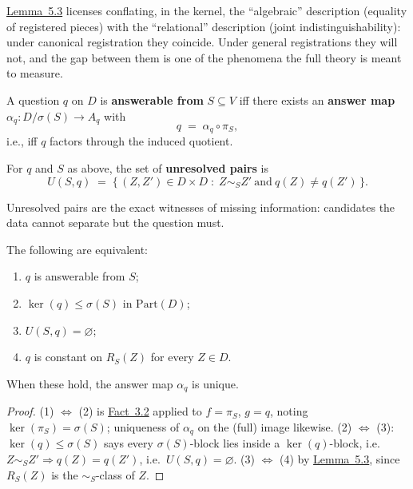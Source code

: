\hyperlink{stmt:5.3}{Lemma~5.3} licenses conflating, in the kernel, the ``algebraic'' description (equality of registered pieces) with the ``relational'' description (joint indistinguishability): under canonical registration they coincide. Under general registrations they will not, and the gap between them is one of the phenomena the full theory is meant to measure.

\begin{thmdef}

A question \(q\) on \(D\) is \textbf{answerable from} \(S \subseteq V\) iff there exists an \textbf{answer map} \(\alpha_q : D/\sigma(S) \to A_q\) with
\[
q \;=\; \alpha_q \circ \pi_S ,
\]
i.e., iff \(q\) factors through the induced quotient.
\end{thmdef}

\begin{thmdef}

For \(q\) and \(S\) as above, the set of \textbf{unresolved pairs} is
\[
U(S, q) \;=\; \{\, (Z, Z') \in D \times D \;:\; Z \sim_S Z' \ \text{and}\ q(Z) \neq q(Z') \,\}.
\]
\end{thmdef}

Unresolved pairs are the exact witnesses of missing information: candidates the data cannot separate but the question must.

\begin{thmplain}

The following are equivalent:

\begin{enumerate}
\def\labelenumi{\arabic{enumi}.}
\tightlist
\item
  \(q\) is answerable from \(S\);
\item
  \(\ker(q) \le \sigma(S)\) in \(\mathrm{Part}(D)\);
\item
  \(U(S, q) = \varnothing\);
\item
  \(q\) is constant on \(R_S(Z)\) for every \(Z \in D\).
\end{enumerate}

When these hold, the answer map \(\alpha_q\) is unique.
\end{thmplain}

\begin{proof}

(1) \(\iff\) (2) is \hyperlink{stmt:3.2}{Fact~3.2} applied to \(f = \pi_S\), \(g = q\), noting \(\ker(\pi_S) = \sigma(S)\); uniqueness of \(\alpha_q\) on the (full) image likewise. (2) \(\iff\) (3): \(\ker(q) \le \sigma(S)\) says every \(\sigma(S)\)-block lies inside a \(\ker(q)\)-block, i.e.~\(Z \sim_S Z' \Rightarrow q(Z) = q(Z')\), i.e.~\(U(S,q) = \varnothing\). (3) \(\iff\) (4) by \hyperlink{stmt:5.3}{Lemma~5.3}, since \(R_S(Z)\) is the \(\sim_S\)-class of \(Z\).
\end{proof}

